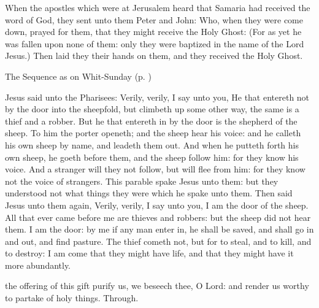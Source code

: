  When the apostles which were at Jerusalem heard that Samaria had received the word of God, they sent unto them Peter and John: Who, when they were come down, prayed for them, that they might receive the Holy Ghost: (For as yet he was fallen upon none of them: only they were baptized in the name of the Lord Jesus.) Then laid they their hands on them, and they received the Holy Ghost.
\begin{rubric}
{The Sequence as on Whit-Sunday (p. \pageref{WhitSeq})}
\end{rubric}

 Jesus said unto the Pharisees: Verily, verily, I say unto you, He that entereth not by the door into the sheepfold, but climbeth up some other way, the same is a thief and a robber. But he that entereth in by the door is the shepherd of the sheep. To him the porter openeth; and the sheep hear his voice: and he calleth his own sheep by name, and leadeth them out. And when he putteth forth his own sheep, he goeth before them, and the sheep follow him: for they know his voice. And a stranger will they not follow, but will flee from him: for they know not the voice of strangers. This parable spake Jesus unto them: but they understood not what things they were which he spake unto them. Then said Jesus unto them again, Verily, verily, I say unto you, I am the door of the sheep. All that ever came before me are thieves and robbers: but the sheep did not hear them. I am the door: by me if any man enter in, he shall be saved, and shall go in and out, and find pasture. The thief cometh not, but for to steal, and to kill, and to destroy: I am come that they might have life, and that they might have it more abundantly.

\secret
{} the offering of this gift purify us, we beseech thee, O Lord: and render us worthy to partake of holy things. Through.



